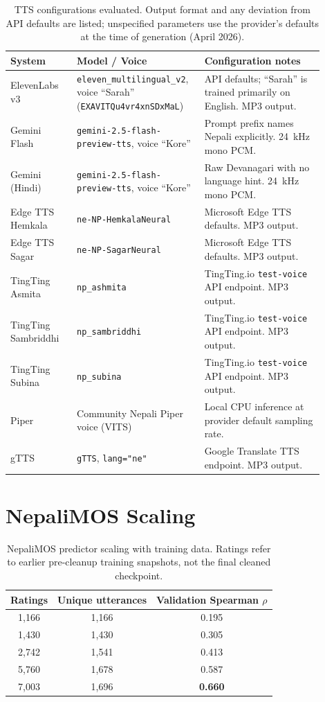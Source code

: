 \documentclass[11pt]{article}
\begin{document}
\begin{table}[h]
\centering
\caption{TTS configurations evaluated. Output format and any deviation from API defaults are listed; unspecified parameters use the provider's defaults at the time of generation (April 2026).}
\label{tab:tts_configs}
\small
\begin{tabular}{p{0.20\linewidth}p{0.34\linewidth}p{0.36\linewidth}}
\toprule
System & Model / Voice & Configuration notes \\
\midrule
ElevenLabs v3 & \texttt{eleven\_multilingual\_v2}, voice ``Sarah'' (\texttt{EXAVITQu4vr4xnSDxMaL}) & API defaults; ``Sarah'' is trained primarily on English. MP3 output. \\
Gemini Flash & \texttt{gemini-2.5-flash-preview-tts}, voice ``Kore'' & Prompt prefix names Nepali explicitly. 24~kHz mono PCM. \\
Gemini (Hindi) & \texttt{gemini-2.5-flash-preview-tts}, voice ``Kore'' & Raw Devanagari with no language hint. 24~kHz mono PCM. \\
Edge TTS Hemkala & \texttt{ne-NP-HemkalaNeural} & Microsoft Edge TTS defaults. MP3 output. \\
Edge TTS Sagar & \texttt{ne-NP-SagarNeural} & Microsoft Edge TTS defaults. MP3 output. \\
TingTing Asmita & \texttt{np\_ashmita} & TingTing.io \texttt{test-voice} API endpoint. MP3 output. \\
TingTing Sambriddhi & \texttt{np\_sambriddhi} & TingTing.io \texttt{test-voice} API endpoint. MP3 output. \\
TingTing Subina & \texttt{np\_subina} & TingTing.io \texttt{test-voice} API endpoint. MP3 output. \\
Piper & Community Nepali Piper voice (VITS) & Local CPU inference at provider default sampling rate. \\
gTTS & \texttt{gTTS}, \texttt{lang="ne"} & Google Translate TTS endpoint. MP3 output. \\
\bottomrule
\end{tabular}
\end{table}

\section{NepaliMOS Scaling}
\label{appx:scaling}

\begin{table}[h]
\centering
\caption{NepaliMOS predictor scaling with training data. Ratings refer to earlier pre-cleanup training snapshots, not the final cleaned checkpoint.}
\label{tab:scaling}
\begin{tabular}{ccc}
\toprule
Ratings & Unique utterances & Validation Spearman $\rho$ \\
\midrule
1{,}166 & 1{,}166 & 0.195 \\
1{,}430 & 1{,}430 & 0.305 \\
2{,}742 & 1{,}541 & 0.413 \\
5{,}760 & 1{,}678 & 0.587 \\
7{,}003 & 1{,}696 & \textbf{0.660} \\
\bottomrule
\end{tabular}
\end{table}
\end{document}
